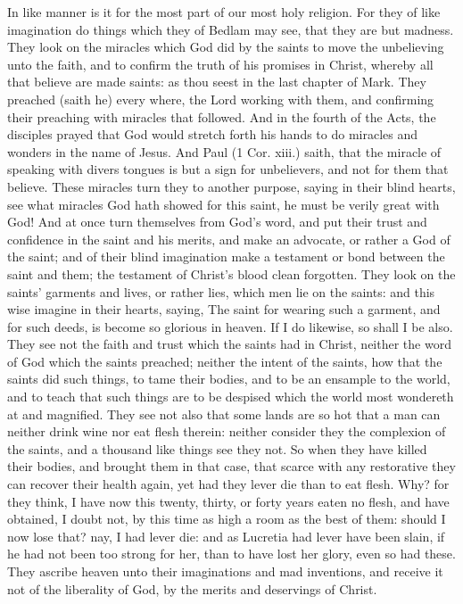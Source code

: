 In like manner is it for the most part of our most holy 
religion. For they of like imagination do things which 
they of Bedlam may see, that they are but madness. 
They look on the miracles which God did by the saints to 
move the unbelieving unto the faith, and to confirm the 
truth of his promises in Christ, whereby all that believe 
are made saints: as thou seest in the last chapter of Mark. 
They preached (saith he) every where, the Lord working 
with them, and confirming their preaching with miracles 
that followed. And in the fourth of the Acts, the disciples
prayed that God would stretch forth his hands to 
do miracles and wonders in the name of Jesus. And 
Paul (1 Cor. xiii.) saith, that the miracle of speaking 
with divers tongues is but a sign for unbelievers, and not 
for them that believe. These miracles turn they to another
purpose, saying in their blind hearts, see what miracles
God hath showed for this saint, he must be verily 
great with God! And at once turn themselves from God's 
word, and put their trust and confidence in the saint and 
his merits, and make an advocate, or rather a God of the 
saint; and of their blind imagination make a testament or 
bond between the saint and them; the testament of Christ's 
blood clean forgotten. They look on the saints' garments 
and lives, or rather lies, which men lie on the saints:
and this wise imagine in their hearts, saying, The saint for
wearing such a garment, and for such deeds, is become 
so glorious in heaven. If I do likewise, so shall I be 
also. They see not the faith and trust which the saints had
in Christ, neither the word of God which the saints 
preached; neither the intent of the saints, how that the 
saints did such things, to tame their bodies, and to be an 
ensample to the world, and to teach that such things are 
to be despised which the world most wondereth at and magnified.
They see not also that some lands are so hot 
that a man can neither drink wine nor eat flesh therein:
neither consider they the complexion of the saints, and a 
thousand like things see they not. So when they have 
killed their bodies, and brought them in that case, that 
scarce with any restorative they can recover their health
again, yet had they lever die than to eat flesh. Why?
for they think, I have now this twenty, thirty, or forty 
years eaten no flesh, and have obtained, I doubt not, by 
this time as high a room as the best of them: should 
I now lose that? nay, I had lever die: and as Lucretia 
had lever have been slain, if he had not been too strong for 
her, than to have lost her glory, even so had these. They 
ascribe heaven unto their imaginations and mad inventions,
and receive it not of the liberality of God, by the merits 
and deservings of Christ. 

